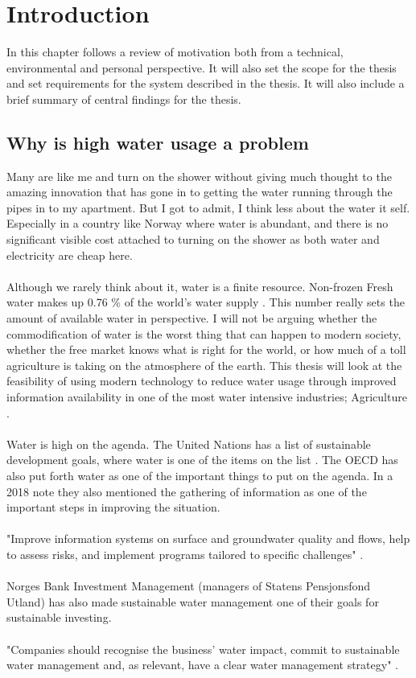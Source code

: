 \documentclass[]{uiophd}
\begin{document}
\mainmatter


\chapter{Introduction}

In this chapter follows a review of motivation both from a technical, environmental and personal perspective. It will also set the scope for the thesis and set requirements for the system described in the thesis. It will also include a brief summary of central findings for the thesis.

\section{Why is high water usage a problem}
Many are like me and turn on the shower without giving much thought to the amazing innovation that has gone in to getting the water running through the pipes in to my apartment. But I got to admit, I think less about the water it self. Especially in a country like Norway where water is abundant, and there is no significant visible cost attached to turning on the shower as both water and electricity are cheap here.
\\\\
Although we rarely think about it, water is a finite resource. Non-frozen Fresh water makes up 0.76 \% of the world's water supply \cite[p.~13]{WaterinCrisis}. This number really sets the amount of available water in perspective. I will not be arguing whether the commodification of water is the worst thing that can happen to modern society, whether the free market knows what is right for the world, or how much of a toll agriculture is taking on the atmosphere of the earth. This thesis will look at the feasibility of using modern technology to reduce water usage through improved information availability in one of the most water intensive industries; Agriculture  \cite{WorldBank}.
\\\\
Water is high on the agenda. The United Nations has a list of sustainable development goals, where water is one of the items on the list \cite{un}. The OECD has also put forth water as one of the important things to put on the agenda. In a 2018 note they also mentioned the gathering of information as one of the important steps in improving the situation. 
\\\\
"Improve information systems on surface and groundwater quality and flows, help to assess risks, and implement programs tailored to specific challenges"  \cite{OECD}.
\\\\
Norges Bank Investment Management (managers of Statens Pensjonsfond Utland) has also made sustainable water management one of their goals for sustainable investing. 
\\\\
"Companies should recognise the business’
water impact, commit to sustainable water
management and, as relevant, have a clear
water management strategy" \cite{NBIM}.
\end{document}
